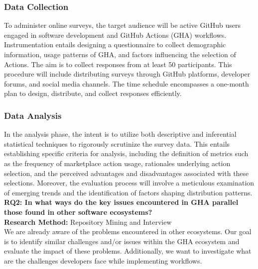 \documentclass[conference]{IEEEtran}
\begin{document}
        \subsubsection{\textbf{Data Collection}}
            To administer online surveys, the target audience will be active GitHub users engaged in software development and GitHub Actions (GHA) workflows. Instrumentation entails designing a questionnaire to collect demographic information, usage patterns of GHA, and factors influencing the selection of Actions. The aim is to collect responses from at least 50 participants. This procedure will include distributing surveys through GitHub platforms, developer forums, and social media channels. The time schedule encompasses a one-month plan to design, distribute, and collect responses efficiently.\\

        \subsubsection{\textbf{Data Analysis}}
            In the analysis phase, the intent is to utilize both descriptive and inferential statistical techniques to rigorously scrutinize the survey data.  This entails establishing specific criteria for analysis, including the definition of metrics such as the frequency of marketplace action usage, rationales underlying action selection, and the perceived advantages and disadvantages associated with these selections. Moreover, the evaluation process will involve a meticulous examination of emerging trends and the identification of factors shaping distribution patterns.\\

        \textbf{RQ2: In what ways do the key issues encountered in GHA parallel those found in other software ecosystems?}\\

        \textbf{Research Method:} Repository Mining and Interview\\

        We are already aware of the problems encountered in other ecosystems. Our goal is to identify similar challenges and/or issues within the GHA ecosystem and evaluate the impact of these problems. Additionally, we want to investigate what are the challenges developers face while implementing workflows.\\
\end{document}
